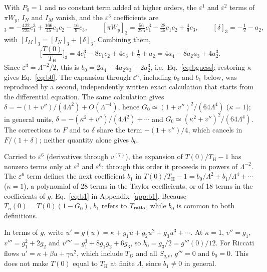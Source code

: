 \documentclass[10pt,a4paper]{article}
\newcommand{\HawkingT}{T_{\mathrm H}}
\begin{document}
With $P_0=1$ and no constant term added at higher orders, the
$\varepsilon^1$ and $\varepsilon^2$ terms of $\pi W_y$, $I_N$ and $I_M$
vanish, and the $\varepsilon^3$ coefficients are
\begin{equation}
 [I_N]_3=-\tfrac{422}{225}c_1^3+\tfrac{166}{45}c_1c_2-\tfrac{16}{9}c_3,\qquad
 [\pi W_y]_3=\tfrac{56}{225}c_1^3-\tfrac{28}{45}c_1c_2+\tfrac49c_3,\qquad
 [\delta]_3=-\tfrac12-a_2,
\end{equation}
with $[I_M]_3=[I_N]_3+[\delta]_3$. Combining them,
\begin{equation}
 \Big[\frac{T(0)}{\HawkingT}\Big]_3=4c_1^3-8c_1c_2+4c_3+\tfrac12+a_2
 =4a_4-8a_2a_3+4a_2^3 .
\end{equation}
Since $\varepsilon^3=\Lambda^{-2}/2$, this is
$b_0=2a_4-4a_2a_3+2a_2^3$, i.e.\ Eq.~\eqref{eq:bguess}; restoring $\kappa$
gives Eq.~\eqref{eq:b0}. The expansion through $\varepsilon^6$, including
$b_0$ and $b_1$ below, was reproduced by a second, independently written
exact calculation that starts from the differential equation. The same
calculation gives $\delta=-(1+v'')/(4\Lambda^2)+O(\Lambda^{-4})$, hence
$G_0\simeq(1+v'')^2/(64\Lambda^4)$ ($\kappa=1$); in general units,
$\delta=-(\kappa^2+v'')/(4\Lambda^2)+\cdots$ and
$G_0\simeq(\kappa^2+v'')^2/(64\Lambda^4)$. The corrections to $F$ and to $\delta$
share the term $-(1+v'')/4$, which cancels in $F/(1+\delta)$; neither
quantity alone gives $b_0$.

Carried to $\varepsilon^6$ (derivatives through $v^{(7)}$), the expansion
of $T(0)/\HawkingT-1$ has nonzero terms only at $\varepsilon^3$ and
$\varepsilon^6$: through this order it proceeds in powers of
$\Lambda^{-2}$. The $\varepsilon^6$ term defines the next coefficient $b_1$
in $T(0)/\HawkingT-1=b_0/\Lambda^2+b_1/\Lambda^4+\cdots$ ($\kappa=1$), a
polynomial of 28 terms in the Taylor coefficients, or of 18 terms in the
coefficients of $g$, Eq.~\eqref{eq:b1} in Appendix~\ref{app:b1}. Because
$T_n(0)=T(0)(1-G_0)$, $b_1$ refers to $T_{\rm ratio}$, while $b_0$ is
common to both definitions.

In terms of $g$, write $u'=g(u)=\kappa+g_1u+g_2u^2+g_3u^3+\cdots$. At
$\kappa=1$, $v''=g_1$, $v'''=g_1^2+2g_2$ and $v''''=g_1^3+8g_1g_2+6g_3$,
so $b_0=g_3/2=g'''(0)/12$. For Riccati flows $u'=\kappa+\beta u+\gamma u^2$,
which include $T_D$ and all $S_{q,t}$, $g'''=0$ and $b_0=0$. This does not
make $T(0)$ equal to $\HawkingT$ at finite $\Lambda$, since $b_1\neq0$ in
general.
\end{document}
